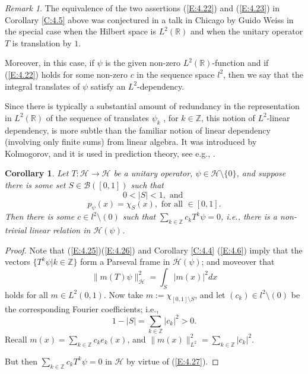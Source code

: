 \documentclass{birkmult}
\newtheorem{cor}[thm]{Corollary}
\theoremstyle{definition}
\theoremstyle{remark}
\newtheorem{rem}[thm]{Remark}
\numberwithin{equation}{section}
\begin{document}
\begin{rem}
\label{R:4.6}
The equivalence of the two assertions (\ref{E:4.22}) and (\ref{E:4.23}) 
in Corollary \ref{C:4.5} above was conjectured in a talk in Chicago by 
Guido Weiss in the special case when the Hilbert space is $L^{2}(\mathbb{R})$ 
and when the unitary operator $T$ is translation by $1$. 

Moreover, in this case, if $\psi$ is the given non-zero 
$L^{2}(\mathbb{R})$-function and if (\ref{E:4.22}) holds for some 
non-zero $c$ in the sequence space $l^{2}$, then we say that the 
integral translates of $\psi$ satisfy an $L^{2}$-dependency.

Since there is typically a substantial amount of redundancy in the 
representation in $L^{2}(\mathbb{R})$ of the sequence of translates  
$\psi_{k}$ , for $k \in \mathbb{Z}$, this notion of $L^{2}$-linear 
dependency, is more subtle than the familiar notion of linear 
dependency (involving only finite sums) from linear algebra. It was 
introduced by Kolmogorov, and it is used in prediction theory, 
see e.g., \cite{MiSa80}.
\end{rem}

\begin{cor}
\label{C:4.7}
Let $T:\mathcal{H} \to \mathcal{H}$ be a unitary operator, 
$\psi \in \mathcal{H} \setminus \{0\}$, and suppose there is some set 
$S \in \mathcal{B}([0,1])$ such that
\begin{equation}
\label{E:4.25}
  0< |S| <1, \text{ and }
\end{equation}
\begin{equation}
\label{E:4.26}
  p_{\psi}(x) = \chi_{S}(x), \text{ for all } \in [0,1].
\end{equation}
Then there is some $c \in l^{2} \setminus (0)$ such that 
$\sum_{k \in \mathbb{Z}} c_{k}T^{k}\psi = 0$, i.e., there is a non-trivial 
linear relation in $\mathcal{H}(\psi)$.
\end{cor}
\begin{proof}
Note that (\ref{E:4.25})(\ref{E:4.26}) and Corollary \ref{C:4.4} (\ref{E:4.6}) 
imply that the vectors $\{T^{k}\psi| k \in \mathbb{Z}\}$ form a Parseval 
frame in $\mathcal{H}(\psi)$; and moveover that 
\begin{equation}
\label{E:4.27}
  \|m(T)\psi\|_{\mathcal{H}}^{2} = \int_{S}|m(x)|^{2}dx
\end{equation}
holds for all $m \in L^{2}(0,1)$.  Now take $m:= \chi_{[0,1] \setminus S}$, 
and let $(c_{k}) \in l^{2} \setminus (0)$ be the corresponding Fourier 
coefficients; i.e., 
\[
  1-|S| = \sum_{k \in \mathbb{Z}} |c_{k}|^{2} >0.
\]
Recall $m(x)=\sum_{k \in \mathbb{Z}}c_{k}e_{k}(x)$, and 
$\|m(x)\|_{L^{2}}^{2}=\sum_{k \in \mathbb{Z}}|c_{k}|^{2}$.

But then $\sum_{k \in \mathbb{Z}} c_{k}T^{k}\psi = 0$ in $\mathcal{H}$ by 
virtue of (\ref{E:4.27}).
\end{proof}
\end{document}
